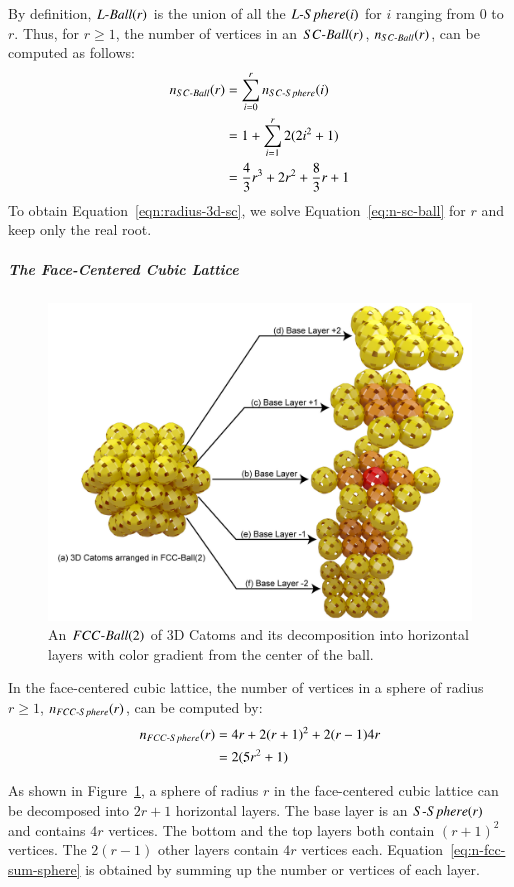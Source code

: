 \begin{pf}
	By definition, $\mathop{L{\textnormal{-}Ball}}(r)$ is the union of all the $\mathop{L{\textnormal{-}Sphere}}(i)$ for $i$ ranging from $0$ to $r$. Thus, for $r \geq 1$, the number of vertices in an $\mathop{SC{\textnormal{-}Ball}}(r)$, $n_{\mathop{SC{\textnormal{-}Ball}}}(r)$, can be computed as follows:
	\begin{align}
	n_{\mathop{SC{\textnormal{-}Ball}}}(r) & = \sum_{i=0}^{r} n_{\mathop{SC{\textnormal{-}Sphere}}}(i) \\
	& =  1 + \sum_{i=1}^{r} 2 (2i^2 + 1)\\
	& = \frac{4}{3} r^3 + 2 r^2 + \frac{8}{3}r + 1
	\label{eq:n-sc-ball}
	\end{align}
	To obtain Equation~\ref{eqn:radius-3d-sc}, we solve Equation~\eqref{eq:n-sc-ball} for $r$ and keep only the real root.
\end{pf}

\subparagraph{\textbf{The Face-Centered Cubic Lattice}}

\begin{figure}[!h]
	\centering
	\includegraphics[width=0.8\linewidth]{images/network-characterization/ball-3dcatoms.png}
	\caption{An $\mathop{FCC{\textnormal{-}Ball}}(2)$ of 3D Catoms and its decomposition into horizontal layers with color gradient from the center of the ball.\label{fig:appendixLMRs:fcc-ball}}
\end{figure}

\begin{lem}
	In the face-centered cubic lattice, the number of vertices in a sphere of radius $r \geq 1$, $n_{\mathop{FCC{\textnormal{-}Sphere}}}(r)$, can be computed by:
	\begin{align}
	\label{eq:n-fcc-sum-sphere}
	n_{\mathop{FCC{\textnormal{-}Sphere}}}(r) &  = 4r + 2(r+1)^2 + 2(r-1)4r\\
	\label{eq:n-fcc-sphere}
	& = 2 (5r^2 + 1)
	\end{align}
\end{lem}
\begin{pf}
	As shown in Figure~\ref{fig:appendixLMRs:fcc-ball}, a sphere of radius $r$ in the face-centered cubic lattice can be decomposed into $2r + 1$ horizontal layers. The base layer is an $\mathop{S{\textnormal{-}Sphere}}(r)$ and contains $4r$ vertices. The bottom and the top layers both contain $(r+1)^2$ vertices. The $2(r-1)$ other layers contain $4r$ vertices each. Equation~\eqref{eq:n-fcc-sum-sphere} is obtained by summing up the number or vertices of each layer.
\end{pf}

